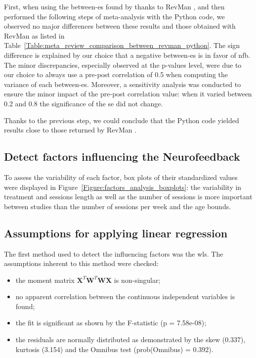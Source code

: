 \documentclass[12pt,a4paper,english]{article}
\begin{document}
First, when using the between-\gls{es} found by \citet{Cortese2016} thanks to RevMan \citep{RevMan}, and then performed the following steps 
of meta-analysis with the Python code, we observed no major differences between these results and those obtained with RevMan \citep{RevMan} 
as listed in Table~\ref{Table:meta_review_comparison_between_revman_python}. The sign difference is explained by our choice that a negative between-\gls{es}
is in favor of \gls{nfb}. The minor discrepancies, especially observed at the p-values level,
were due to our choice to always use a pre-post correlation of 0.5 when computing the variance of each between-\gls{es}. Moreover, a sensitivity 
analysis was conducted to ensure the minor impact of the pre-post correlation value: when it varied between 0.2 and 0.8 the significance 
of the \gls{se} did not change. 

Thanks to the previous step, we could conclude that the Python code yielded results close to those returned by RevMan \citet{RevMan}.		

\subsection{Detect factors influencing the Neurofeedback}

To assess the variability of each factor, box plots of their standardized values were displayed in Figure~\ref{Figure:factors_analysis_boxplots}: 
the variability in treatment and sessions length as well as the number of sessions is more important between studies than the number of 
sessions per week and the age bounds.  

\subsection{Assumptions for applying linear regression}

The first method used to detect the influencing factors was the \gls{wls}. The assumptions inherent to this method were checked: 
\begin{itemize}
	\item the moment matrix ${\textbf{X}}^{T}\textbf{W}^{T}\textbf{WX}$ is non-singular;
  \item no apparent correlation between the continuous independent variables is found; 
  \item the fit is significant as shown by the F-statistic (p = 7.58e-08); 
  \item the residuals are normally distributed as demonstrated by the skew (0.337), kurtosis (3.154) and the Omnibus test (prob(Omnibus) = 0.392).
\end{itemize} 
\end{document}
